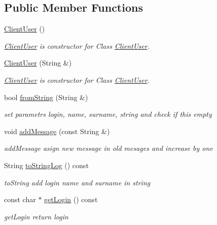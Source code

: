 \subsection*{Public Member Functions}
\begin{DoxyCompactItemize}
\item 
\hyperlink{classClientUser_a0c60cdac1feb0952d3b1c1170b1a69bc}{Client\+User} ()\hypertarget{classClientUser_a0c60cdac1feb0952d3b1c1170b1a69bc}{}\label{classClientUser_a0c60cdac1feb0952d3b1c1170b1a69bc}

\begin{DoxyCompactList}\small\item\em \hyperlink{classClientUser}{Client\+User} is constructor for Class \hyperlink{classClientUser}{Client\+User}. \end{DoxyCompactList}\item 
\hyperlink{classClientUser_a0e9c1c34ca28ab22bd0f960ab1ee88f9}{Client\+User} (String \&)
\begin{DoxyCompactList}\small\item\em \hyperlink{classClientUser}{Client\+User} is constructor for Class \hyperlink{classClientUser}{Client\+User}. \end{DoxyCompactList}\item 
bool \hyperlink{classClientUser_aa1fbbd82131fbbab5b468ff12ad7ccaf}{from\+String} (String \&)
\begin{DoxyCompactList}\small\item\em set parametrs login, name, surname, string and check if this empty \end{DoxyCompactList}\item 
void \hyperlink{classClientUser_a34a1353a6b7c4b0c53e621944efc8137}{add\+Message} (const String \&)
\begin{DoxyCompactList}\small\item\em add\+Message asign new message in old mesages and increase by one \end{DoxyCompactList}\item 
String \hyperlink{classClientUser_a73a3633182af0f7ea8cd6534e0d1bbce}{to\+String\+Log} () const 
\begin{DoxyCompactList}\small\item\em to\+String add login name and surname in string \end{DoxyCompactList}\item 
const char $\ast$ \hyperlink{classClientUser_a54826c29f4420a811f65dd7babbf7ad0}{get\+Login} () const 
\begin{DoxyCompactList}\small\item\em get\+Login return login \end{DoxyCompactList}\item 

\end{DoxyCompactItemize}

